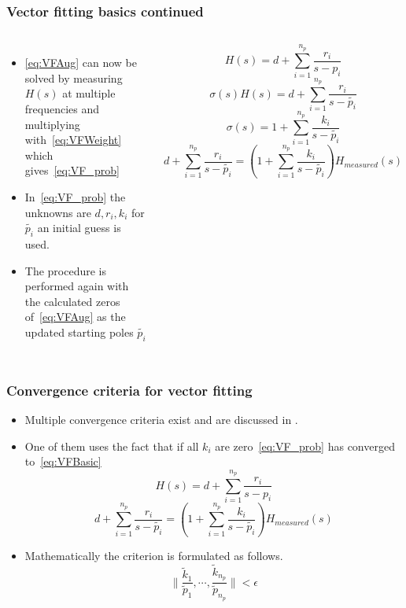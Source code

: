 \begin{frame}
	\setcounter{equation}{2}
	\frametitle{Vector fitting basics continued}
	\begin{columns}[c]
			\begin{itemize}
				\item<1-> \eqref{eq:VFAug} can now be solved by measuring $H(s)$ at multiple frequencies and multiplying with~\eqref{eq:VFWeight} which gives~\eqref{eq:VF_prob}
				\item<2-> In~\eqref{eq:VF_prob} the unknowns are $d,r_i,k_i$ for $\tilde{p_i}$ an initial guess is used.
				\item<3-> The procedure is performed again with the calculated zeros of~\eqref{eq:VFAug} as the updated starting poles $\tilde{p_i}$
			\end{itemize}
				\begin{equation}
					\label{eq:VFBasic}
					H(s) = d + \sum^{n_p}_{i=1}\frac{r_i}{s-p_i}
				\end{equation}
				\begin{equation}
					\label{eq:VFAug}
					\sigma(s)H(s) = d + \sum^{n_p}_{i=1}\frac{r_i}{s-\tilde{p_i}}
				\end{equation}
						\begin{equation}
							\label{eq:VFWeight}
							\sigma(s) = 1+\sum^{n_p}_{i=1}\frac{k_i}{s-\tilde{p_i}}
						\end{equation}
				\begin{equation}\label{eq:VF_prob}
				d + \sum^{n_p}_{i=1}\frac{r_i}{s-\tilde{p_i}} =(1+\sum^{n_p}_{i=1}\frac{k_i}{s-\tilde{p_i}})H_{measured}(s)
				\end{equation}
	\end{columns}
\end{frame}
\begin{frame}
	\frametitle{Convergence criteria for vector fitting}
		\begin{itemize}
			\item<1-> Multiple convergence criteria exist and are discussed in \cite{stefano_grivet-talocia_passive_2016}.
			\item<2-> One of them uses the fact that if all $k_i$ are zero~\eqref{eq:VF_prob} has converged to~\eqref{eq:VFBasic}
\setcounter{equation}{2}
				\begin{equation}
					\label{eq:VFBasic}
					H(s) = d + \sum^{n_p}_{i=1}\frac{r_i}{s-p_i}
				\end{equation}
\setcounter{equation}{5}
				\begin{equation}\label{eq:VF_prob}
				d + \sum^{n_p}_{i=1}\frac{r_i}{s-\tilde{p_i}} =(1+\sum^{n_p}_{i=1}\frac{k_i}{s-\tilde{p_i}})H_{measured}(s)
				\end{equation}
		\item<3-> Mathematically the criterion is formulated as follows.
\begin{equation}
    \label{eq:VFConvergence}
    \|\frac{\tilde{k}_1}{\tilde{p}_1},\cdots,\frac{\tilde{k}_{n_p}}{\tilde{p}_{n_p}}\| < \epsilon
\end{equation}
	\end{itemize}
\end{frame}
